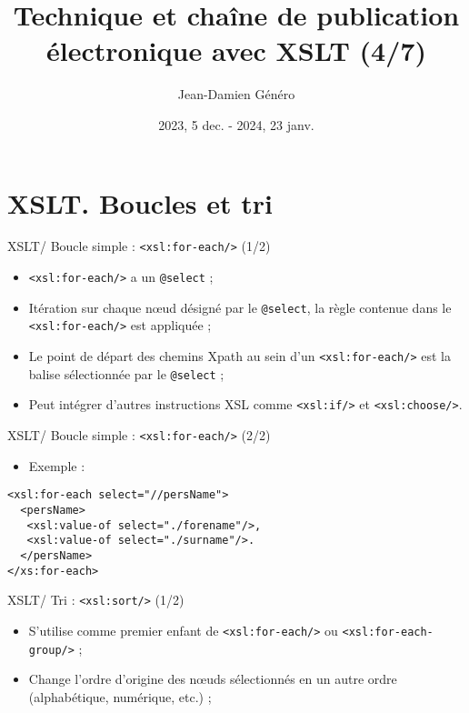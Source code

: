 \documentclass{beamer}
\title{Technique et chaîne de publication électronique avec XSLT (4/7)}
\date{2023, 5 dec. - 2024, 23 janv.}
\author{Jean-Damien Généro}
\institute{École nationale des chartes -- M2 TNAH}
\begin{document}
    \maketitle

    \section{XSLT. Boucles et tri}

    \begin{frame}{XSLT/ Boucle simple : \texttt{<xsl:for-each/>} (1/2)}
        \Large
        \begin{itemize}
            \item \texttt{<xsl:for-each/>} a un \texttt{@select} ;
            \bigskip
            \item Itération sur chaque n\oe ud désigné par le \texttt{@select}, la règle contenue dans le \texttt{<xsl:for-each/>} est appliquée ;
            \bigskip
            \item Le point de départ des chemins Xpath au sein d'un \texttt{<xsl:for-each/>} est la balise sélectionnée par le \texttt{@select} ;
            \bigskip
            \item Peut intégrer d'autres instructions XSL comme \texttt{<xsl:if/>} et \texttt{<xsl:choose/>}.
        \end{itemize}
    \end{frame}

    \begin{frame}[fragile]{XSLT/ Boucle simple : \texttt{<xsl:for-each/>} (2/2)}
        \Large
        \begin{itemize}
            \item Exemple :
        \end{itemize}
        \begin{verbatim}
<xsl:for-each select="//persName">
  <persName>
   <xsl:value-of select="./forename"/>,
   <xsl:value-of select="./surname"/>.
  </persName>
</xs:for-each>
        \end{verbatim}
    \end{frame}

    \begin{frame}{XSLT/ Tri : \texttt{<xsl:sort/>} (1/2)}
        \Large
        \begin{itemize}
            \item S'utilise comme premier enfant de \texttt{<xsl:for-each/>} ou \texttt{<xsl:for-each-group/>} ;
            \bigskip
            \item Change l'ordre d'origine des n\oe uds sélectionnés en un autre ordre (alphabétique, numérique, etc.) ;
        \end{itemize}
    \end{frame}
\end{document}
